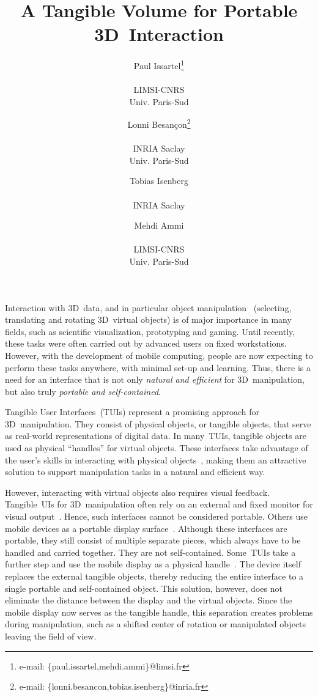 \documentclass{vgtc}                         \havecopyrightspacefalse
\title{A Tangible Volume for Portable 3D~Interaction}
\author{Paul Issartel\thanks{e-mail: \{paul.issartel,mehdi.ammi\}@limsi.fr}\\ \parbox{1.4in}{\scriptsize \centering LIMSI-CNRS \\ Univ. Paris-Sud} \and Lonni Besançon\thanks{e-mail: \{lonni.besancon,tobias.isenberg\}@inria.fr}\\ \parbox{1.4in}{\scriptsize \centering INRIA Saclay\\ Univ. Paris-Sud} \and Tobias Isenberg\footnotemark[2]\\ \parbox{1.4in}{\scriptsize \centering INRIA Saclay} \and Mehdi Ammi\footnotemark[1]\\ \parbox{1.4in}{\scriptsize \centering LIMSI-CNRS \\ Univ. Paris-Sud}}
\begin{document}

\maketitle



Interaction with 3D~data, and in particular object manipulation~\cite{bowman04} (selecting, translating and rotating 3D~virtual objects) is of major importance in many fields, such as scientific visualization, prototyping and gaming. Until recently, these tasks were often carried out by advanced users on fixed workstations. However, with the development of mobile computing, people are now expecting to perform these tasks anywhere, with minimal set-up and learning. Thus, there is a need for an interface that is not only \emph{natural and efficient} for 3D~manipulation, but also truly \emph{portable and self-contained}.

Tangible User Interfaces~(TUIs) represent a promising approach for 3D~manipulation. They consist of physical objects, or tangible objects, that serve as real-world representations of digital data. In many~TUIs, tangible objects are used as physical ``handles'' for virtual objects. These interfaces take advantage of the user's skills in interacting with physical objects~\cite{ishii08}, making them an attractive solution to support manipulation tasks in a natural and efficient way.

However, interacting with virtual objects also requires visual feedback. Tangible~UIs for 3D~manipulation often rely on an external and fixed monitor for visual output~\cite{hinckley94}. Hence, such interfaces cannot be considered portable. Others use mobile devices as a portable display surface~\cite{issartel14-2}. Although these interfaces are portable, they still consist of multiple separate pieces, which always have to be handled and carried together. They are not self-contained. Some~TUIs take a further step and use the mobile display as a physical handle~\cite{henrysson05}. The device itself replaces the external tangible objects, thereby reducing the entire interface to a single portable and self-contained object. This solution, however, does not eliminate the distance between the display and the virtual objects. Since the mobile display now serves as the tangible handle, this separation creates problems during manipulation, such as a shifted center of rotation or manipulated objects leaving the field of view.
\end{document}
